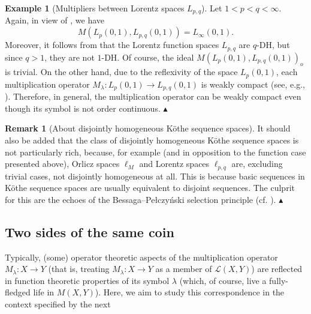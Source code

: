 \documentclass[11pt]{amsart}
\theoremstyle{definition}
\theoremstyle{definition}
\theoremstyle{definition}
\theoremstyle{definition}
\theoremstyle{definition}
\theoremstyle{definition}
\newtheorem{remark}[theorem]{Remark}
\theoremstyle{definition}
\newtheorem{example}[theorem]{Example}
\theoremstyle{definition}
\numberwithin{equation}{section}
\numberwithin{equation}{section}
\numberwithin{equation}{section}
\theoremstyle{definition}
\theoremstyle{definition}
\theoremstyle{definition}
\theoremstyle{definition}
\theoremstyle{definition}
\theoremstyle{definition}
\newcommand\xqed[1]{%
	\leavevmode\unskip\penalty9999 \hbox{}\nobreak\hfill
	\quad\hbox{#1}}
\newcommand\demo{\xqed{{\Large $\blacktriangle$}}}
\begin{document}
\begin{example}[Multipliers between Lorentz spaces $L_{p,q}$] \label{EXP: Lorentz symbol not OC but WC}
	Let $1 < p < q < \infty$. Again, in view of \cite[Theorem~4]{KLM19}, we have
	\begin{equation*}
		M(L_p(0,1),L_{p,q}(0,1)) = L_{\infty}(0,1).
	\end{equation*}
	Moreover, it follows from \cite[Proposition~5.1]{FJT75} that the Lorentz function spaces $L_{p,q}$ are $q$-DH, but since $q > 1$, they are not $1$-DH.
	Of course, the ideal $M(L_p(0,1),L_{p,q}(0,1))_o$ is trivial. On the other hand, due to the reflexivity of the space $L_p(0,1)$, each multiplication
	operator $M_{\lambda} \colon L_p(0,1) \rightarrow L_{p,q}(0,1)$ is weakly compact (see, e.g., \cite[p.~348]{AK06}). Therefore, in general, the multiplication
	operator can be weakly compact even though its symbol is not order continuous.
	\demo
\end{example}

\begin{remark}[About disjointly homogeneous K{\" o}the sequence spaces]
	It should also be added that the class of disjointly homogeneous K{\" o}the sequence spaces is not particularly rich, because, for example (and in
	opposition to the function case presented above), Orlicz spaces $\ell_M$ and Lorentz spaces $\ell_{p,q}$ are, excluding trivial cases,
	not disjointly homogeneous at all. This is because basic sequences in K{\" o}the sequence spaces are usually equivalent to disjoint sequences.
	The culprit for this are the echoes of the Bessaga--Pe{\l}czy{\' n}ski selection principle (cf. \cite[Proposition~3.1.10, p.~14]{AK06}).
	\demo
\end{remark}

\subsection{Two sides of the same coin}
Typically, (some) operator theoretic aspects of the multiplication operator $M_{\lambda} \colon X \rightarrow Y$ (that is, treating $M_{\lambda} \colon X \rightarrow Y$
as a member of $\mathscr{L}(X,Y)$) are reflected in function theoretic properties of its symbol $\lambda$ (which, of course,
live a fully-fledged life in $M(X,Y)$). Here, we aim to study this correspondence in the context specified by the next
\end{document}
